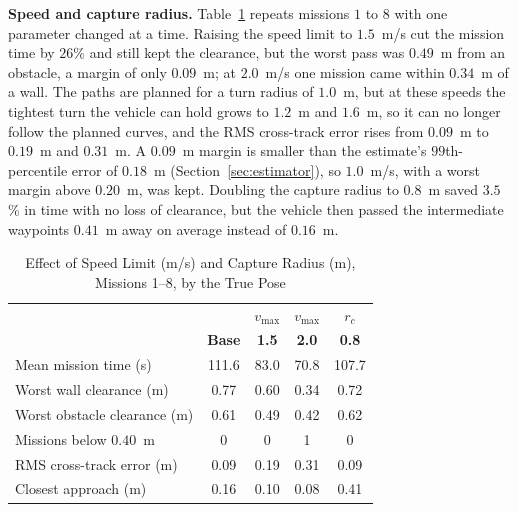 \textbf{Speed and capture radius.} Table~\ref{tab:sweep} repeats
missions $1$ to $8$ with one parameter changed at a time. Raising the
speed limit to $1.5$~m/s cut the mission time by $26$\% and still kept
the clearance, but the worst pass was $0.49$~m from an obstacle, a
margin of only $0.09$~m; at $2.0$~m/s one mission came within $0.34$~m
of a wall. The paths are planned for a turn radius of $1.0$~m, but at
these speeds the tightest turn the vehicle can hold grows to $1.2$~m
and $1.6$~m, so it can no longer follow the planned curves, and the RMS
cross-track error rises from $0.09$~m to $0.19$~m and $0.31$~m. A
$0.09$~m margin is smaller than the estimate's $99$th-percentile error of
$0.18$~m (Section~\ref{sec:estimator}), so $1.0$~m/s, with a worst margin
above $0.20$~m, was kept. Doubling the capture radius to $0.8$~m saved
$3.5$\% in time with no loss of clearance, but the vehicle then passed
the intermediate waypoints $0.41$~m away on average instead of
$0.16$~m.

\begin{table}[!t]
    \centering
    \caption{Effect of Speed Limit (m/s) and Capture Radius (m), Missions 1--8, by the True Pose}
    \label{tab:sweep}
    \footnotesize
    \begin{tabularx}{\columnwidth}{@{}X c c c c@{}}
        \toprule
        & & $v_{\max}$ & $v_{\max}$ & $r_{c}$ \\
        & \textbf{Base} & \textbf{1.5} & \textbf{2.0} & \textbf{0.8} \\
        \midrule
        Mean mission time (s)          & 111.6 & 83.0 & 70.8 & 107.7 \\
        Worst wall clearance (m)       & 0.77 & 0.60 & 0.34 & 0.72 \\
        Worst obstacle clearance (m)   & 0.61 & 0.49 & 0.42 & 0.62 \\
        Missions below $0.40$~m        & 0 & 0 & 1 & 0 \\
        RMS cross-track error (m)      & 0.09 & 0.19 & 0.31 & 0.09 \\
        Closest approach (m)           & 0.16 & 0.10 & 0.08 & 0.41 \\
        \bottomrule
    \end{tabularx}
\end{table}

